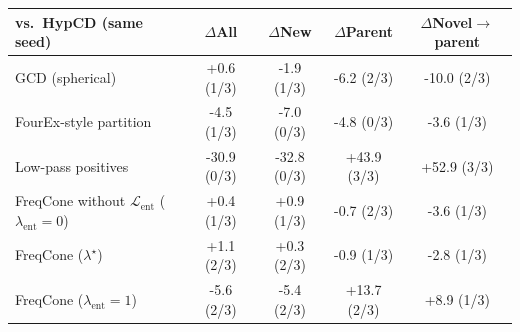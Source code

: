 \begin{tabular}{lcccc}
\toprule
vs.\ HypCD (same seed) & $\Delta$All & $\Delta$New & $\Delta$Parent & $\Delta$Novel$\to$parent \\
\midrule
GCD (spherical) & +0.6 (1/3) & -1.9 (1/3) & -6.2 (2/3) & -10.0 (2/3) \\
FourEx-style partition & -4.5 (1/3) & -7.0 (0/3) & -4.8 (0/3) & -3.6 (1/3) \\
Low-pass positives & -30.9 (0/3) & -32.8 (0/3) & +43.9 (3/3) & +52.9 (3/3) \\
FreqCone without $\mathcal{L}_{\mathrm{ent}}$ ($\lambda_{\mathrm{ent}}{=}0$) & +0.4 (1/3) & +0.9 (1/3) & -0.7 (2/3) & -3.6 (1/3) \\
FreqCone ($\lambda^\star$) & +1.1 (2/3) & +0.3 (2/3) & -0.9 (1/3) & -2.8 (1/3) \\
FreqCone ($\lambda_{\mathrm{ent}}{=}1$) & -5.6 (2/3) & -5.4 (2/3) & +13.7 (2/3) & +8.9 (1/3) \\
\bottomrule
\end{tabular}
